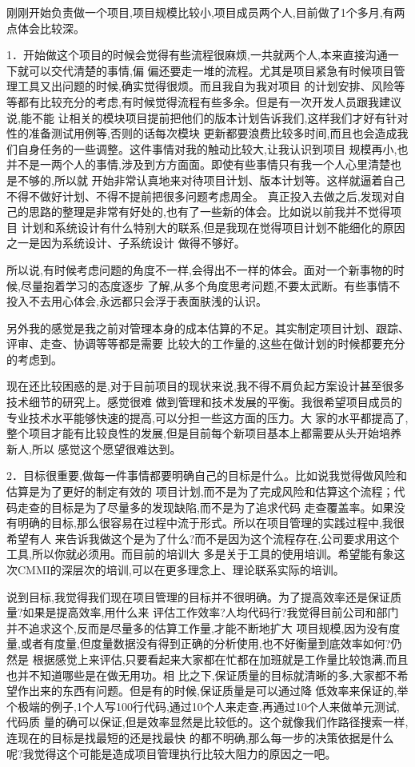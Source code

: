 \documentclass[11pt]{article}
\begin{document}
\begin{staff}
\slogo 刚刚开始负责做一个项目,项目规模比较小,项目成员两个人,目前做了1个多月,有两点体会比较深。

1．开始做这个项目的时候会觉得有些流程很麻烦,一共就两个人,本来直接沟通一下就可以交代清楚的事情,偏
偏还要走一堆的流程。尤其是项目紧急有时候项目管理工具又出问题的时候,确实觉得很烦。而且我自为我对项目
的计划安排、风险等等都有比较充分的考虑,有时候觉得流程有些多余。但是有一次开发人员跟我建议说,能不能
让相关的模块项目提前把他们的版本计划告诉我们,这样我们才好有针对性的准备测试用例等,否则的话每次模块
更新都要浪费比较多时间,而且也会造成我们自身任务的一些调整。这件事情对我的触动比较大,让我认识到项目
规模再小,也并不是一两个人的事情,涉及到方方面面。即使有些事情只有我一个人心里清楚也是不够的,所以就
开始非常认真地来对待项目计划、版本计划等。这样就逼着自己不得不做好计划、不得不提前把很多问题考虑周全。
真正投入去做之后,发现对自己的思路的整理是非常有好处的,也有了一些新的体会。比如说以前我并不觉得项目
计划和系统设计有什么特别大的联系,但是我现在觉得项目计划不能细化的原因之一是因为系统设计、子系统设计
做得不够好。

所以说,有时候考虑问题的角度不一样,会得出不一样的体会。面对一个新事物的时候,尽量抱着学习的态度逐步
了解,从多个角度思考问题,不要太武断。有些事情不投入不去用心体会,永远都只会浮于表面肤浅的认识。

另外我的感觉是我之前对管理本身的成本估算的不足。其实制定项目计划、跟踪、评审、走查、协调等等都是需要
比较大的工作量的,这些在做计划的时候都要充分的考虑到。

现在还比较困惑的是,对于目前项目的现状来说,我不得不肩负起方案设计甚至很多技术细节的研究上。感觉很难
做到管理和技术发展的平衡。我很希望项目成员的专业技术水平能够快速的提高,可以分担一些这方面的压力。大
家的水平都提高了,整个项目才能有比较良性的发展,但是目前每个新项目基本上都需要从头开始培养新人,所以
感觉这个愿望很难达到。


2．目标很重要,做每一件事情都要明确自己的目标是什么。比如说我觉得做风险和估算是为了更好的制定有效的
项目计划,而不是为了完成风险和估算这个流程；代码走查的目标是为了尽量多的发现缺陷,而不是为了追求代码
走查覆盖率。如果没有明确的目标,那么很容易在过程中流于形式。所以在项目管理的实践过程中,我很希望有人
来告诉我做这个是为了什么?而不是因为这个流程存在,公司要求用这个工具,所以你就必须用。而目前的培训大
多是关于工具的使用培训。希望能有象这次CMMI的深层次的培训,可以在更多理念上、理论联系实际的培训。

说到目标,我觉得我们现在项目管理的目标并不很明确。为了提高效率还是保证质量?如果是提高效率,用什么来
评估工作效率?人均代码行?我觉得目前公司和部门并不追求这个,反而是尽量多的估算工作量,才能不断地扩大
项目规模,因为没有度量,或者有度量,但度量数据没有得到正确的分析使用,也不好衡量到底效率如何?仍然是
根据感觉上来评估,只要看起来大家都在忙都在加班就是工作量比较饱满,而且也并不知道哪些是在做无用功。相
比之下,保证质量的目标就清晰的多,大家都不希望作出来的东西有问题。但是有的时候,保证质量是可以通过降
低效率来保证的,举个极端的例子,1个人写100行代码,通过10个人来走查,再通过10个人来做单元测试,代码质
量的确可以保证,但是效率显然是比较低的。这个就像我们作路径搜索一样,连现在的目标是找最短的还是找最快
的都不明确,那么每一步的决策依据是什么呢?我觉得这个可能是造成项目管理执行比较大阻力的原因之一吧。



\end{staff}
\end{document}
